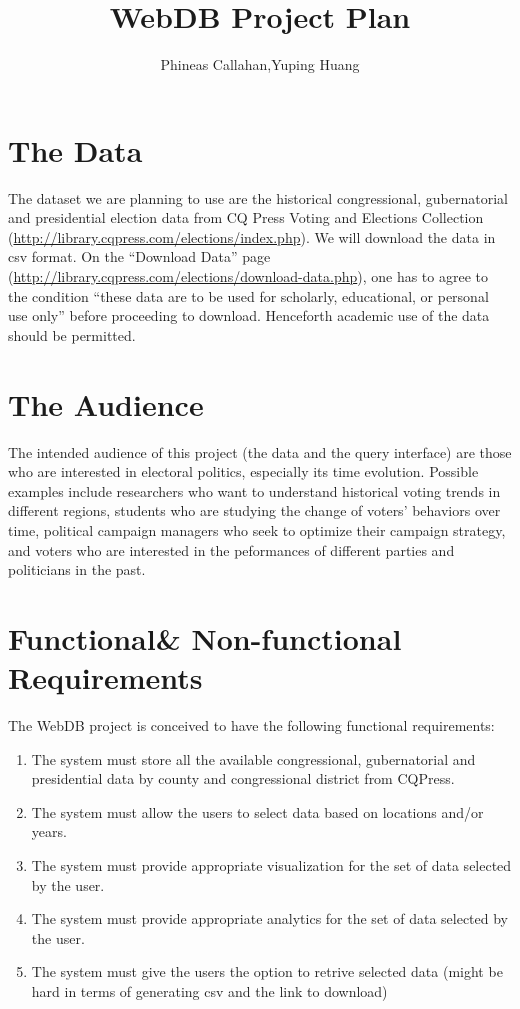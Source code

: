 \documentclass[12pt]{article}
\title{WebDB Project Plan}
\author{Phineas Callahan,Yuping Huang}
\begin{document}
 \maketitle

\section{The Data}
The dataset we are planning to use are the historical congressional, gubernatorial and presidential 
election data from CQ Press Voting and Elections Collection (\url{http://library.cqpress.com/elections/index.php}).
We will download the data in csv format. On the “Download Data” page 
(\url{http://library.cqpress.com/elections/download-data.php}),
one has to agree to the condition “these data are to be used for scholarly, educational, or personal use only” 
before proceeding to download. Henceforth academic use of the data should be permitted.

\section{The Audience}
The intended audience of this project (the data and the query interface) are those who are interested in electoral
politics, especially its time evolution. Possible examples include researchers who want to understand historical voting trends in different
regions, students who are studying the change of voters' behaviors over time, political campaign managers who seek
to optimize their campaign strategy, and voters who are interested in the peformances of different parties and politicians
in the past.

\section{Functional\& Non-functional Requirements}
The WebDB project is conceived to have the following functional requirements:
\begin{enumerate}
 \item The system must store all the available congressional, gubernatorial and presidential data by county and congressional district from CQPress.
 \item The system must allow the users to select data based on locations and/or years.
 \item The system must provide appropriate visualization for the set of data selected by the user.
 \item The system must provide appropriate analytics for the set of data selected by the user.
 \item The system must give the users the option to retrive selected data (might be hard in terms of generating csv and the link to download)
\end{enumerate}
\end{document}
